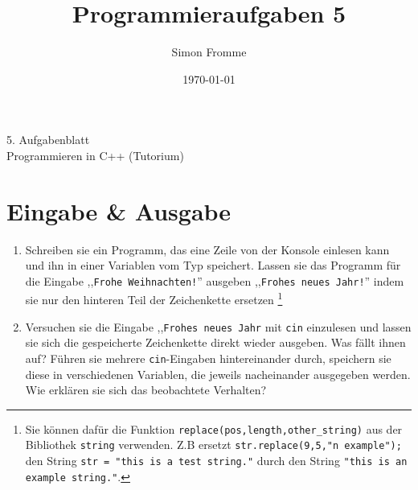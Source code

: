 \documentclass[paper=a4, fontsize=11pt, twoside]{scrartcl}
\title{Programmieraufgaben 5}
\author{Simon Fromme}
\date{\normalsize\today}
\begin{document}
\vspace*{0.75\baselineskip}
\begin{center}
  \Large 5. Aufgabenblatt \\\vspace{0.5em} \large Programmieren in C++ (Tutorium)
\end{center}


\section*{Eingabe \& Ausgabe}
\begin{enumerate}
	\item Schreiben sie ein Programm, das eine Zeile von der Konsole einlesen kann und ihn in einer Variablen vom Typ  speichert. 
		Lassen sie das Programm für die Eingabe ,,\texttt{Frohe Weihnachten!}'' ausgeben ,,\texttt{Frohes neues Jahr!}'' indem sie nur den hinteren Teil der Zeichenkette ersetzen
			\footnote{Sie können dafür die Funktion \texttt{replace(pos,length,other_string)} aus der Bibliothek \texttt{string} verwenden. Z.B ersetzt \texttt{str.replace(9,5,"n example");} den String \texttt{str = "this is a test string."} durch den String \texttt{"this is an example string."}.  }
		\item Versuchen sie die Eingabe ,,\texttt{Frohes neues Jahr} mit \texttt{cin} einzulesen und lassen sie sich die gespeicherte Zeichenkette direkt wieder ausgeben. Was fällt ihnen auf? Führen sie mehrere \texttt{cin}-Eingaben hintereinander durch, speichern sie diese in verschiedenen Variablen, die jeweils nacheinander ausgegeben werden. Wie erklären sie sich das beobachtete Verhalten?
\end{enumerate}
\end{document}
